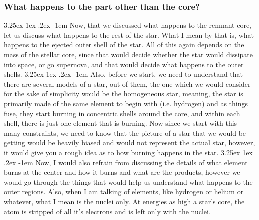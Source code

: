 \documentclass[a4paper,twoside,11pt]{article}
\makeatletter
\numberwithin{equation}{section}
\renewcommand\paragraph{\@startsection{paragraph}{5}{\z@}%
  {3.25ex \@plus1ex \@minus.2ex}%
  {-1em}%
  {\normalfont\normalsize\bfseries}}
\makeatother
\begin{document}
\subsubsection{What happens to the part other than the core?}
\paragraph{}
Now, that we discussed what happens to the remnant core, let us discuss what happens to the rest of the star. What I mean by that is, what happens to the ejected outer shell of the star. All of this again depends on the mass of the stellar core, since that would decide whether the star would dissipate into space, or go supernova, and that would decide what happens to the outer shells.
\paragraph{}
Also, before we start, we need to understand that there are several models of a star, out of them, the one which we would consider for the sake of simplicity would be the homogeneous star, meaning, the star is primarily made of the same element to begin with (i.e. hydrogen) and as things fuse, they start burning in concentric shells around the core, and within each shell, there is just one element that is burning. Now since we start with this many constraints, we need to know that the picture of a star that we would be getting would be heavily biased and would not represent the actual star, however, it would give you a rough idea as to how burning happens in the star. 
\paragraph{}
Now, I would also refrain from discussing the details of what element burns at the center and how it burns and what are the products, however we would go through the things that would help us understand what happens to the outer regions. Also, when I am talking of elements, like hydrogen or helium or whatever, what I mean is the nuclei only. At energies as high a star's core, the atom is stripped of all it's electrons and is left only with the nuclei. 
\newpage
\end{document}
